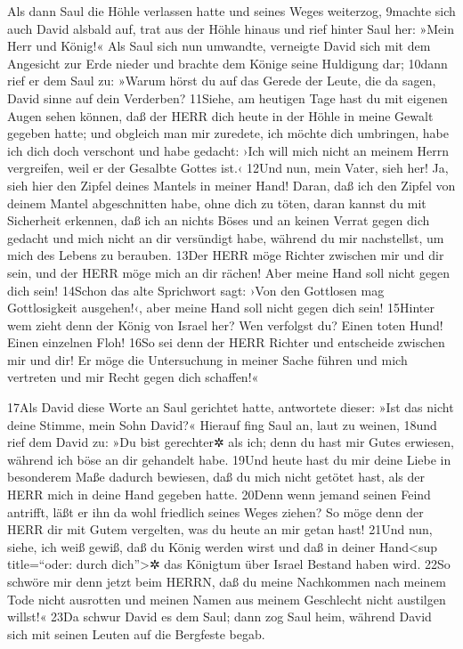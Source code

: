 Als dann Saul die Höhle verlassen hatte und seines Weges weiterzog,
9machte sich auch David alsbald auf, trat aus der Höhle hinaus und rief
hinter Saul her: »Mein Herr und König!« Als Saul sich nun umwandte,
verneigte David sich mit dem Angesicht zur Erde nieder und brachte dem
Könige seine Huldigung dar; 10dann rief er dem Saul zu: »Warum hörst du
auf das Gerede der Leute, die da sagen, David sinne auf dein Verderben?
11Siehe, am heutigen Tage hast du mit eigenen Augen sehen können, daß
der HERR dich heute in der Höhle in meine Gewalt gegeben hatte; und
obgleich man mir zuredete, ich möchte dich umbringen, habe ich dich doch
verschont und habe gedacht: ›Ich will mich nicht an meinem Herrn
vergreifen, weil er der Gesalbte Gottes ist.‹ 12Und nun, mein Vater,
sieh her! Ja, sieh hier den Zipfel deines Mantels in meiner Hand! Daran,
daß ich den Zipfel von deinem Mantel abgeschnitten habe, ohne dich zu
töten, daran kannst du mit Sicherheit erkennen, daß ich an nichts Böses
und an keinen Verrat gegen dich gedacht und mich nicht an dir versündigt
habe, während du mir nachstellst, um mich des Lebens zu berauben. 13Der
HERR möge Richter zwischen mir und dir sein, und der HERR möge mich an
dir rächen! Aber meine Hand soll nicht gegen dich sein! 14Schon das alte
Sprichwort sagt: ›Von den Gottlosen mag Gottlosigkeit ausgehen!‹, aber
meine Hand soll nicht gegen dich sein! 15Hinter wem zieht denn der König
von Israel her? Wen verfolgst du? Einen toten Hund! Einen einzelnen
Floh! 16So sei denn der HERR Richter und entscheide zwischen mir und
dir! Er möge die Untersuchung in meiner Sache führen und mich vertreten
und mir Recht gegen dich schaffen!«

17Als David diese Worte an Saul gerichtet hatte, antwortete dieser: »Ist
das nicht deine Stimme, mein Sohn David?« Hierauf fing Saul an, laut zu
weinen, 18und rief dem David zu: »Du bist gerechter✲ als ich; denn du
hast mir Gutes erwiesen, während ich böse an dir gehandelt habe. 19Und
heute hast du mir deine Liebe in besonderem Maße dadurch bewiesen, daß
du mich nicht getötet hast, als der HERR mich in deine Hand gegeben
hatte. 20Denn wenn jemand seinen Feind antrifft, läßt er ihn da wohl
friedlich seines Weges ziehen? So möge denn der HERR dir mit Gutem
vergelten, was du heute an mir getan hast! 21Und nun, siehe, ich weiß
gewiß, daß du König werden wirst und daß in deiner Hand\textless sup
title=``oder: durch dich''\textgreater✲ das Königtum über Israel Bestand
haben wird. 22So schwöre mir denn jetzt beim HERRN, daß du meine
Nachkommen nach meinem Tode nicht ausrotten und meinen Namen aus meinem
Geschlecht nicht austilgen willst!« 23Da schwur David es dem Saul; dann
zog Saul heim, während David sich mit seinen Leuten auf die Bergfeste
begab.

